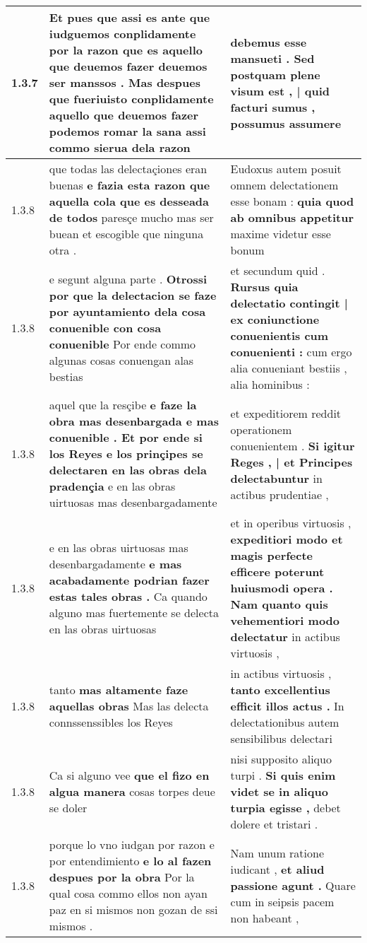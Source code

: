 \begin{tabular}{|p{1cm}|p{6.5cm}|p{6.5cm}|}
1.3.7 & Et pues que assi es ante que iudguemos conplidamente por la razon que es aquello que deuemos fazer deuemos ser manssos . \textbf{ Mas despues que fueriuisto conplidamente aquello que deuemos fazer podemos romar la sana } assi commo sierua dela razon & debemus esse mansueti . \textbf{ Sed postquam plene visum est , | quid facturi sumus , } possumus assumere \\\hline
1.3.8 & que todas las delectaçiones eran buenas \textbf{ e fazia esta razon que aquella cola que es desseada de todos } paresçe mucho mas ser buean et escogible que ninguna otra . & Eudoxus autem posuit omnem delectationem esse bonam : \textbf{ quia quod ab omnibus appetitur } maxime videtur esse bonum \\\hline
1.3.8 & e segunt alguna parte . \textbf{ Otrossi por que la delectacion se faze por ayuntamiento dela cosa conuenible con cosa conuenible } Por ende commo algunas cosas conuengan alas bestias & et secundum quid . \textbf{ Rursus quia delectatio contingit | ex coniunctione conuenientis cum conuenienti : } cum ergo alia conueniant bestiis , alia hominibus : \\\hline
1.3.8 & aquel que la resçibe \textbf{ e faze la obra mas desenbargada e mas conuenible . Et por ende si los Reyes e los prinçipes se delectaren en las obras dela pradençia } e en las obras uirtuosas mas desenbargadamente & et expeditiorem reddit operationem conuenientem . \textbf{ Si igitur Reges , | et Principes delectabuntur } in actibus prudentiae , \\\hline
1.3.8 & e en las obras uirtuosas mas desenbargadamente \textbf{ e mas acabadamente podrian fazer estas tales obras . } Ca quando alguno mas fuertemente se delecta en las obras uirtuosas & et in operibus virtuosis , \textbf{ expeditiori modo et magis perfecte efficere poterunt huiusmodi opera . Nam quanto quis vehementiori modo delectatur } in actibus virtuosis , \\\hline
1.3.8 & tanto \textbf{ mas altamente faze aquellas obras } Mas las delecta connssenssibles los Reyes & in actibus virtuosis , \textbf{ tanto excellentius efficit illos actus . } In delectationibus autem sensibilibus delectari \\\hline
1.3.8 & Ca si alguno vee \textbf{ que el fizo en algua manera } cosas torpes deue se doler & nisi supposito aliquo turpi . \textbf{ Si quis enim videt se in aliquo turpia egisse , } debet dolere et tristari . \\\hline
1.3.8 & porque lo vno iudgan por razon e por entendimiento \textbf{ e lo al fazen despues por la obra } Por la qual cosa commo ellos non ayan paz en si mismos non gozan de ssi mismos . & Nam unum ratione iudicant , \textbf{ et aliud passione agunt . } Quare cum in seipsis pacem non habeant , \\\hline

\end{tabular}
